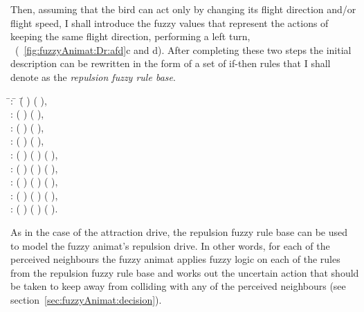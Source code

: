 %
Then, assuming that the bird can act only by changing its flight direction and/or flight speed, I shall introduce the fuzzy values that represent the actions of keeping the same flight direction, performing a left turn, \etc\ (\figs~\ref{fig:fuzzyAnimat:Dr:afd}c and d). After completing these two steps the initial description can be rewritten in the form of a set of if-then rules that I shall denote as the \emph{repulsion fuzzy rule base}.

{\footnotesize
\begin{tabbing}
\quad \= : \quad \=  \=(  )  (  ), \\
\> : \>  (  )  (  ), \\
\> : \>  (  )  (  ), \\
\> : \>  (  )  (  ), \\
\> : \>  (  )  (  )  (  ), \\
\> : \>  (  )  (  )  (  ), \\
\> : \>  (  )  (  )  (  ), \\
\> : \>  (  )  (  )  (  ), \\
\> : \>  (  )  (  )  (  ).
\end{tabbing}
}

As in the case of the attraction drive, the repulsion fuzzy rule base can be used to model the fuzzy animat's repulsion drive. In other words, for each of the perceived neighbours the fuzzy animat applies fuzzy logic on each of the rules from the repulsion fuzzy rule base and works out the uncertain action that should be taken to keep away from colliding with any of the perceived neighbours (see section~\ref{sec:fuzzyAnimat:decision}).

